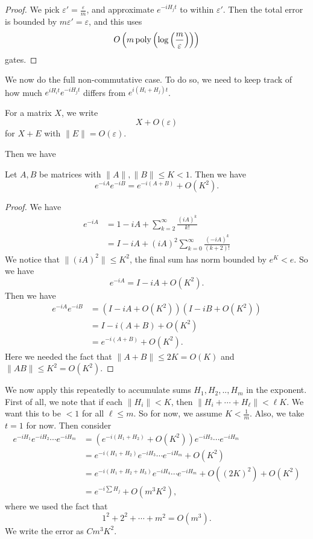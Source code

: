 \begin{proof}
  We pick $\varepsilon' = \frac{\varepsilon}{m}$, and approximate $e^{-iH_jt}$ to within $\varepsilon'$. Then the total error is bounded by $m\varepsilon' = \varepsilon$, and this uses
  \[
    O\left(m \operatorname{poly}\left(\log\left(\frac{m}{\varepsilon}\right)\right)\right)
  \]
  gates.
\end{proof}

We now do the full non-commutative case. To do so, we need to keep track of how much $e^{iH_i t} e^{-i H_j t}$ differs from $e^{i(H_i + H_j) t}$.

\begin{notation}
  For a matrix $X$, we write
  \[
    X + O (\varepsilon)
  \]
  for $X + E$ with $\|E\| = O(\varepsilon)$.
\end{notation}

Then we have
\begin{lemma}
  Let $A, B$ be matrices with $\|A\|, \|B\| \leq K < 1$. Then we have
  \[
    e^{-iA} e^{-iB} = e^{-i(A + B)} + O(K^2).
  \]
\end{lemma}

\begin{proof}
  We have
  \begin{align*}
    e^{-iA} &= 1 - iA + \sum_{k = 2}^\infty \frac{(iA)^k}{k!}\\
    &= I - iA + (iA)^2 \sum_{k = 0}^\infty \frac{(-iA)^k}{(k + 2)!}
  \end{align*}
  We notice that $\|(iA)^2\| \leq K^2$, the final sum has norm bounded by $e^K < e$. So we have
  \[
    e^{-iA} = I - iA + O(K^2).
  \]
  Then we have
  \begin{align*}
    e^{-iA} e^{-iB} &= (I - iA + O(K^2))(I - iB + O(K^2)) \\
    &= I - i(A + B) + O(K^2) \\
    &= e^{-i(A + B)} + O(K^2).
  \end{align*}
  Here we needed the fact that $\|A + B\| \leq 2K = O(K)$ and $\|AB\| \leq K^2 = O(K^2)$.
\end{proof}

We now apply this repeatedly to accumulate sums $H_1, H_2, .., H_m$ in the exponent. First of all, we note that if each $\|H_i\| < K$, then $\|H_i + \cdots + H_\ell\| < \ell K$. We want this to be $ < 1$ for all $\ell \leq m$. So for now, we assume $K < \frac{1}{m}$. Also, we take $t = 1$ for now. Then consider
\begin{align*}
  e^{-iH_1} e^{-iH_2} \cdots e^{-iH_m} &= (e^{-i(H_1 + H_2)} + O(K^2)) e^{-i H_3} \cdots e^{-iH_m}\\
  &= e^{-i(H_1 + H_2)} e^{-iH_3} \cdots e^{-i H_m} + O(K^2)\\
  &= e^{-i(H_1 + H_2 + H_3)} e^{-iH_4} \cdots e^{-iH_m} + O((2K)^2) + O(K^2)\\
  &= e^{-i\sum H_j} + O(m^3 K^2),
\end{align*}
where we used the fact that
\[
  1^2 + 2^2 + \cdots + m^2 = O(m^3).
\]
We write the error as $C m^3 K^2$.

